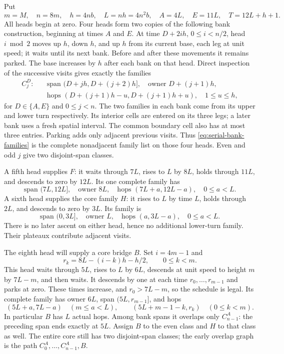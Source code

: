 \begin{outline}
Put
\[
 m=M,\quad n=8m,\quad h=4nb,
 \quad L=nh=4n^2b,
 \quad A=4L,\quad E=11L,
 \quad T=12L+h+1.
\]
All heads begin at zero.  Four heads form two copies of the following
bank construction, beginning at times $A$ and $E$.  At time $D+2ih$,
$0\le i<n/2$, head $i\bmod2$ moves up $h$, down $h$, and up $h$ from
its current base, each leg at unit speed; it waits until its next bank.
Before and after these movements it remains parked.  The base increases
by $h$ after each bank on that head.  Direct inspection of the successive
visits gives exactly the families
\begin{equation}
 \begin{split}
 C_j^D:\quad &\text{span }(D+jh,D+(j+2)h],
       \quad\text{owner }D+(j+1)h,\\
 &\text{hops }(D+(j+1)h-u,D+(j+1)h+u),\quad1\le u\le h,
 \end{split}
 \label{eq:serial-bank-families}
\end{equation}
for $D\in\{A,E\}$ and $0\le j<n$.  The two families in each bank
come from its upper and lower turn respectively.  Its interior cells
are entered on its three legs; a later bank uses a fresh spatial
interval.  The common boundary cell also has at most three entries.
Parking adds only adjacent previous visits.  Thus
\cref{eq:serial-bank-families} is the complete nonadjacent family list
on those four heads.  Even and odd $j$ give two disjoint-span classes.

A fifth head supplies $F$: it waits through $7L$, rises to $L$ by
$8L$, holds through $11L$, and descends to zero by $12L$.  Its one
complete family has
\[
 \text{span }(7L,12L],\quad\text{owner }8L,
 \quad\text{hops }(7L+a,12L-a),\quad0\le a<L.
\]
A sixth head supplies the core family $H$: it rises to $L$ by time
$L$, holds through $2L$, and descends to zero by $3L$.  Its family is
\[
 \text{span }(0,3L],\quad\text{owner }L,
 \quad\text{hops }(a,3L-a),\quad0\le a<L.
\]
There is no later ascent on either head, hence no additional lower-turn
family.  Their plateaux contribute adjacent visits.

The eighth head will supply a core bridge $B$.  Set $i=4m-1$ and
\[
 r_k=8L-(i-k)h-h/2,\qquad0\le k<m.
\]
This head waits through $5L$, rises to $L$ by $6L$, descends at unit
speed to height $m$ by $7L-m$, and then waits.  It descends by one at
each time $r_0,\ldots,r_{m-1}$ and parks at zero.  These times increase,
and $r_0>7L-m$, so the schedule is legal.  Its complete family has
owner $6L$, span $(5L,r_{m-1}]$, and hops
\[
 (5L+a,7L-a)\quad(m\le a<L),\qquad
 (5L+m-1-k,r_k)\quad(0\le k<m).
\]
In particular $B$ has $L$ actual hops.  Among bank spans it overlaps
only $C_{n-1}^{A}$: the preceding span ends exactly at $5L$.  Assign
$B$ to the even class and $H$ to that class as well.  The entire core
still has two disjoint-span classes; the early overlap graph is the
path $C_0^A,\ldots,C_{n-1}^A,B$.


\end{outline}
